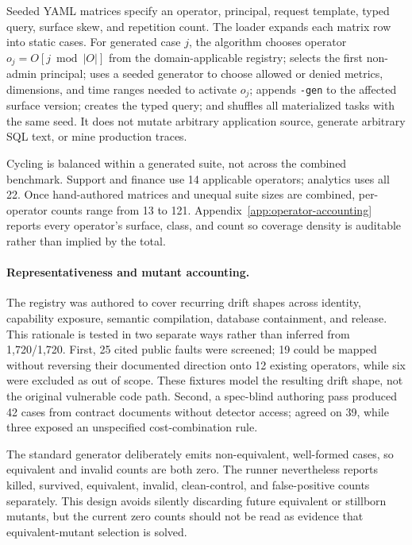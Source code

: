 Seeded YAML matrices specify an operator, principal, request template, typed query, surface skew, and repetition count. The loader expands each matrix row into static cases. For generated case $j$, the algorithm chooses operator $o_j=O[j\bmod |O|]$ from the domain-applicable registry; selects the first non-admin principal; uses a seeded generator to choose allowed or denied metrics, dimensions, and time ranges needed to activate $o_j$; appends \texttt{-gen} to the affected surface version; creates the typed query; and shuffles all materialized tasks with the same seed. It does not mutate arbitrary application source, generate arbitrary SQL text, or mine production traces.

Cycling is balanced within a generated suite, not across the combined benchmark. Support and finance use 14 applicable operators; analytics uses all 22. Once hand-authored matrices and unequal suite sizes are combined, per-operator counts range from 13 to 121. Appendix~\ref{app:operator-accounting} reports every operator's surface, class, and count so coverage density is auditable rather than implied by the total.

\paragraph{Representativeness and mutant accounting.}
The registry was authored to cover recurring drift shapes across identity, capability exposure, semantic compilation, database containment, and release. This rationale is tested in two separate ways rather than inferred from 1,720/1,720. First, 25 cited public faults were screened; 19 could be mapped without reversing their documented direction onto 12 existing operators, while six were excluded as out of scope. These fixtures model the resulting drift shape, not the original vulnerable code path. Second, a spec-blind authoring pass produced 42 cases from contract documents without detector access; \policystrata{} agreed on 39, while three exposed an unspecified cost-combination rule.

The standard generator deliberately emits non-equivalent, well-formed cases, so equivalent and invalid counts are both zero. The runner nevertheless reports killed, survived, equivalent, invalid, clean-control, and false-positive counts separately. This design avoids silently discarding future equivalent or stillborn mutants, but the current zero counts should not be read as evidence that equivalent-mutant selection is solved.

